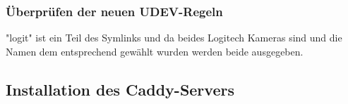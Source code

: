\subsubsection{Überprüfen der neuen UDEV-Regeln}
\vspace{0.3cm}
"{}logit"{} ist ein Teil des Symlinks und da beides Logitech Kameras sind und die Namen dem entsprechend gewählt wurden werden beide ausgegeben.


\subsection{Installation des Caddy-Servers}

